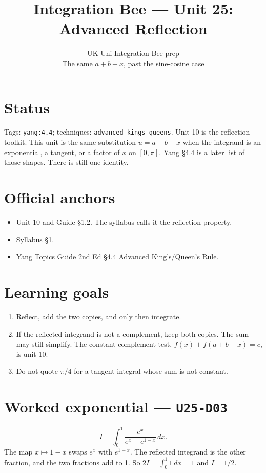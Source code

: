 
\title{Integration Bee --- Unit 25:\\ Advanced Reflection}
\author{UK Uni Integration Bee prep\\ The same $a+b-x$, past the sine-cosine case}
\date{}

\maketitle
\section*{Status}
Tags: \texttt{yang:4.4}; techniques: \texttt{advanced-kings-queens}.
Unit 10 is the reflection toolkit. This unit is the same substitution $u=a+b-x$ when the integrand is an exponential, a tangent, or a factor of $x$ on $[0,\pi]$. Yang \S4.4 is a later list of those shapes. There is still one identity.
\section{Official anchors}
\begin{itemize}
\item Unit 10 and Guide \S1.2. The syllabus calls it the reflection property.
\item Syllabus \S1.
\item Yang Topics Guide 2nd Ed \S4.4 Advanced King's/Queen's Rule.
\end{itemize}
\section{Learning goals}
\begin{enumerate}
  \item Reflect, add the two copies, and only then integrate.
  \item If the reflected integrand is not a complement, keep both copies. The sum may still simplify. The constant-complement test, $f(x)+f(a+b-x)=c$, is unit 10.
  \item Do not quote $\pi/4$ for a tangent integral whose sum is not constant.
\end{enumerate}

\section{Worked exponential --- \texttt{U25-D03}}
\[
I=\int_0^1\frac{e^x}{e^x+e^{1-x}}\,dx.
\]
The map $x\mapsto 1-x$ swaps $e^x$ with $e^{1-x}$. The reflected integrand is the other fraction, and the two fractions add to 1. So $2I=\int_0^1 1\,dx=1$ and $I=1/2$.

